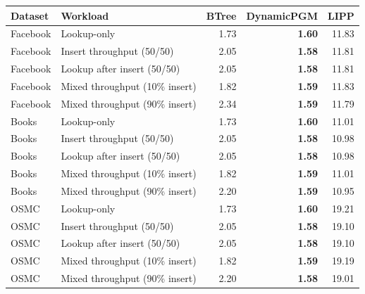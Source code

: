 \begin{tabular}{llrrr}
\toprule
Dataset & Workload & BTree & DynamicPGM & LIPP \\
\midrule
Facebook & Lookup-only & 1.73 & \textbf{1.60} & 11.83 \\
Facebook & Insert throughput (50/50) & 2.05 & \textbf{1.58} & 11.81 \\
Facebook & Lookup after insert (50/50) & 2.05 & \textbf{1.58} & 11.81 \\
Facebook & Mixed throughput (10\% insert) & 1.82 & \textbf{1.59} & 11.83 \\
Facebook & Mixed throughput (90\% insert) & 2.34 & \textbf{1.59} & 11.79 \\
\midrule
Books & Lookup-only & 1.73 & \textbf{1.60} & 11.01 \\
Books & Insert throughput (50/50) & 2.05 & \textbf{1.58} & 10.98 \\
Books & Lookup after insert (50/50) & 2.05 & \textbf{1.58} & 10.98 \\
Books & Mixed throughput (10\% insert) & 1.82 & \textbf{1.59} & 11.01 \\
Books & Mixed throughput (90\% insert) & 2.20 & \textbf{1.59} & 10.95 \\
\midrule
OSMC & Lookup-only & 1.73 & \textbf{1.60} & 19.21 \\
OSMC & Insert throughput (50/50) & 2.05 & \textbf{1.58} & 19.10 \\
OSMC & Lookup after insert (50/50) & 2.05 & \textbf{1.58} & 19.10 \\
OSMC & Mixed throughput (10\% insert) & 1.82 & \textbf{1.59} & 19.19 \\
OSMC & Mixed throughput (90\% insert) & 2.20 & \textbf{1.58} & 19.01 \\
\bottomrule
\end{tabular}
